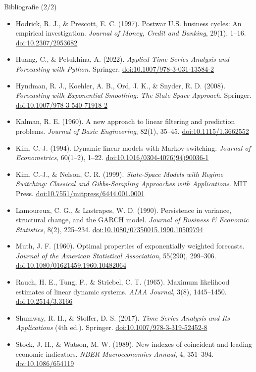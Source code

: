 \begin{frame}{Bibliografie (2/2)}
\itemsize{\scriptsize}
\begin{itemize}
    \item Hodrick, R. J., \& Prescott, E. C. (1997). Postwar U.S. business cycles: An empirical investigation. \textit{Journal of Money, Credit and Banking}, 29(1), 1--16. \href{https://doi.org/10.2307/2953682}{doi:10.2307/2953682}
    \item Huang, C., \& Petukhina, A. (2022). \textit{Applied Time Series Analysis and Forecasting with Python}. Springer. \href{https://doi.org/10.1007/978-3-031-13584-2}{doi:10.1007/978-3-031-13584-2}
    \item Hyndman, R. J., Koehler, A. B., Ord, J. K., \& Snyder, R. D. (2008). \textit{Forecasting with Exponential Smoothing: The State Space Approach}. Springer. \href{https://doi.org/10.1007/978-3-540-71918-2}{doi:10.1007/978-3-540-71918-2}
    \item Kalman, R. E. (1960). A new approach to linear filtering and prediction problems. \textit{Journal of Basic Engineering}, 82(1), 35--45. \href{https://doi.org/10.1115/1.3662552}{doi:10.1115/1.3662552}
    \item Kim, C.-J. (1994). Dynamic linear models with Markov-switching. \textit{Journal of Econometrics}, 60(1--2), 1--22. \href{https://doi.org/10.1016/0304-4076(94)90036-1}{doi:10.1016/0304-4076(94)90036-1}
    \item Kim, C.-J., \& Nelson, C. R. (1999). \textit{State-Space Models with Regime Switching: Classical and Gibbs-Sampling Approaches with Applications}. MIT Press. \href{https://doi.org/10.7551/mitpress/6444.001.0001}{doi:10.7551/mitpress/6444.001.0001}
    \item Lamoureux, C. G., \& Lastrapes, W. D. (1990). Persistence in variance, structural change, and the GARCH model. \textit{Journal of Business \& Economic Statistics}, 8(2), 225--234. \href{https://doi.org/10.1080/07350015.1990.10509794}{doi:10.1080/07350015.1990.10509794}
    \item Muth, J. F. (1960). Optimal properties of exponentially weighted forecasts. \textit{Journal of the American Statistical Association}, 55(290), 299--306. \href{https://doi.org/10.1080/01621459.1960.10482064}{doi:10.1080/01621459.1960.10482064}
    \item Rauch, H. E., Tung, F., \& Striebel, C. T. (1965). Maximum likelihood estimates of linear dynamic systems. \textit{AIAA Journal}, 3(8), 1445--1450. \href{https://doi.org/10.2514/3.3166}{doi:10.2514/3.3166}
    \item Shumway, R. H., \& Stoffer, D. S. (2017). \textit{Time Series Analysis and Its Applications} (4th ed.). Springer. \href{https://doi.org/10.1007/978-3-319-52452-8}{doi:10.1007/978-3-319-52452-8}
    \item Stock, J. H., \& Watson, M. W. (1989). New indexes of coincident and leading economic indicators. \textit{NBER Macroeconomics Annual}, 4, 351--394. \href{https://doi.org/10.1086/654119}{doi:10.1086/654119}
\end{itemize}
\end{frame}


